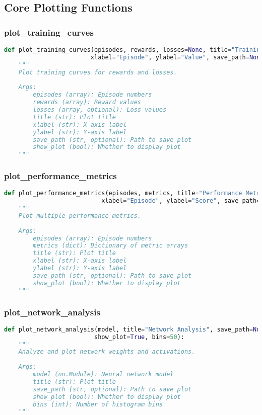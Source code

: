 \subsection{Core Plotting Functions}

\subsubsection{plot\_training\_curves}

\begin{lstlisting}[language=python]
def plot_training_curves(episodes, rewards, losses=None, title="Training Progress",
                        xlabel="Episode", ylabel="Value", save_path=None, show_plot=True):
    """
    Plot training curves for rewards and losses.
    
    Args:
        episodes (array): Episode numbers
        rewards (array): Reward values
        losses (array, optional): Loss values
        title (str): Plot title
        xlabel (str): X-axis label
        ylabel (str): Y-axis label
        save_path (str, optional): Path to save plot
        show_plot (bool): Whether to display plot
    """
\end{lstlisting}

\subsubsection{plot\_performance\_metrics}

\begin{lstlisting}[language=python]
def plot_performance_metrics(episodes, metrics, title="Performance Metrics",
                           xlabel="Episode", ylabel="Score", save_path=None, show_plot=True):
    """
    Plot multiple performance metrics.
    
    Args:
        episodes (array): Episode numbers
        metrics (dict): Dictionary of metric arrays
        title (str): Plot title
        xlabel (str): X-axis label
        ylabel (str): Y-axis label
        save_path (str, optional): Path to save plot
        show_plot (bool): Whether to display plot
    """
\end{lstlisting}

\subsubsection{plot\_network\_analysis}

\begin{lstlisting}[language=python]
def plot_network_analysis(model, title="Network Analysis", save_path=None,
                         show_plot=True, bins=50):
    """
    Analyze and plot network weights and activations.
    
    Args:
        model (nn.Module): Neural network model
        title (str): Plot title
        save_path (str, optional): Path to save plot
        show_plot (bool): Whether to display plot
        bins (int): Number of histogram bins
    """
\end{lstlisting}

